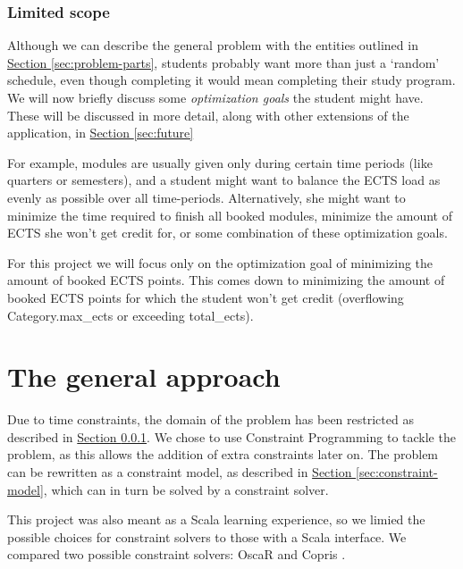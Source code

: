\documentclass[a4paper]{article}
\begin{document}

\subsubsection{Limited scope}
\label{sec:problem-scope}
Although we can describe the general problem with the entities outlined in 
\hyperref[sec:problem-parts]{Section \ref*{sec:problem-parts}}, 
students probably want more than just a `random' schedule, even though completing it would mean completing their study program.
We will now briefly discuss some \emph{optimization goals} the student might have. 
These will be discussed in more detail, along with other extensions of the application, in 
\hyperref[sec:future]{Section \ref*{sec:future}}

For example, modules are usually given only during certain time periods (like quarters or semesters), and a student might want to balance the ECTS load as evenly as possible over all time-periods.
Alternatively, she might want to minimize the time required to finish all booked modules, minimize the amount of ECTS she won't get credit for, or some combination of these optimization goals.

For this project we will focus only on the optimization goal of minimizing the amount of booked ECTS points.
This comes down to minimizing the amount of booked ECTS points for which the student won't get credit (overflowing Category.max\_ects or exceeding total\_ects).


\section{The general approach}
Due to time constraints, the domain of the problem has been restricted as described in
\hyperref[sec:problem-scope]{Section \ref*{sec:problem-scope}}.
We chose to use Constraint Programming to tackle the problem, as this allows the addition of extra constraints later on.
The problem can be rewritten as a constraint model, as described in 
\hyperref[sec:constraint-model]{Section \ref*{sec:constraint-model}}, which can in turn be solved by a constraint solver.

This project was also meant as a Scala learning experience, so we limied the possible choices for constraint solvers to those with a Scala interface.
We compared two possible constraint solvers: OscaR \cite{oscar} and Copris \cite{copris}.
\end{document}
